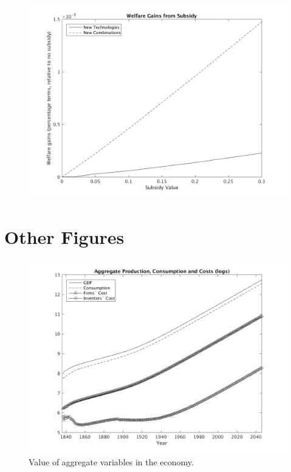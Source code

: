 \documentclass[serif]{article}
\theoremstyle{definition}
\begin{document}
\begin{figure}[h!]
\centering
\includegraphics[width=.8\textwidth]{figures/welfare_gains.png}
\end{figure}

\clearpage

\section*{Other Figures}

\begin{figure}[h!]
\centering
\includegraphics[width=\textwidth]{figures/aggregates.png}
\caption{Value of aggregate variables in the economy.}
\end{figure}
\end{document}
